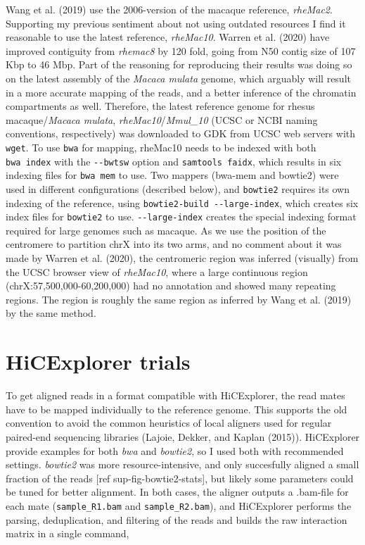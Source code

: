 \documentclass[
  11pt,
  a4paper,
]{scrbook}
\let\oldemph\emph
\renewcommand\emph[1]{\oldemph{\color{gray}#1}}
\begin{document}
Wang et al. (2019) use the 2006-version of the macaque reference,
\emph{rheMac2}. Supporting my previous sentiment about not using
outdated resources I find it reasonable to use the latest reference,
\emph{rheMac10}. Warren et al. (2020) have improved contiguity from
\emph{rhemac8} by 120 fold, going from N50 contig size of 107 Kbp to 46
Mbp. Part of the reasoning for reproducing their results was doing so on
the latest assembly of the \emph{Macaca mulata} genome, which arguably
will result in a more accurate mapping of the reads, and a better
inference of the chromatin compartments as well. Therefore, the latest
reference genome for rhesus macaque/\emph{Macaca mulata},
\emph{rheMac10}/\emph{Mmul\_10} (UCSC or NCBI naming conventions,
respectively) was downloaded to GDK from UCSC web servers with
\texttt{wget}. To use \texttt{bwa} for mapping, rheMac10 needs to be
indexed with both \texttt{bwa\ index} with the \texttt{-\/-bwtsw} option
and \texttt{samtools\ faidx}, which results in six indexing files for
\texttt{bwa\ mem} to use. Two mappers (bwa-mem and bowtie2) were used in
different configurations (described below), and \texttt{bowtie2}
requires its own indexing of the reference, using
\texttt{bowtie2-build\ -\/-large-index}, which creates six index files
for \texttt{bowtie2} to use. \texttt{-\/-large-index} creates the
special indexing format required for large genomes such as macaque. As
we use the position of the centromere to partition chrX into its two
arms, and no comment about it was made by Warren et al. (2020), the
centromeric region was inferred (visually) from the UCSC browser view of
\emph{rheMac10}, where a large continuous region
(chrX:57,500,000-60,200,000) had no annotation and showed many repeating
regions. The region is roughly the same region as inferred by Wang et
al. (2019) by the same method.

\section{HiCExplorer trials}\label{hicexplorer-trials}

To get aligned reads in a format compatible with HiCExplorer, the read
mates have to be mapped individually to the reference genome. This
supports the old convention to avoid the common heuristics of local
aligners used for regular paired-end sequencing libraries (Lajoie,
Dekker, and Kaplan (2015)). HiCExplorer provide examples for both
\emph{bwa} and \emph{bowtie2}, so I used both with recommended settings.
\emph{bowtie2} was more resource-intensive, and only succesfully aligned
a small fraction of the reads {[}ref sup-fig-bowtie2-stats{]}, but
likely some parameters could be tuned for better alignment. In both
cases, the aligner outputs a .bam-file for each mate
(\texttt{sample\_R1.bam} and \texttt{sample\_R2.bam}), and HiCExplorer
performs the parsing, deduplication, and filtering of the reads and
builds the raw interaction matrix in a single command,
\end{document}
